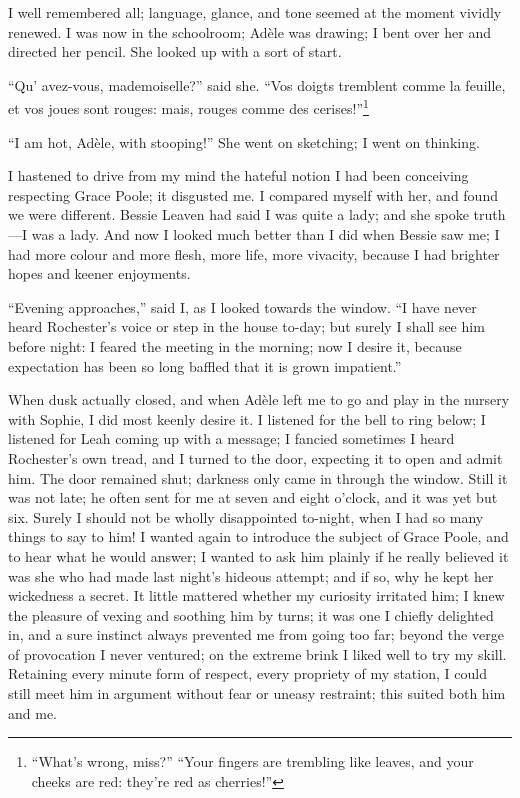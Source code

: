 I well remembered all; language, glance, and tone seemed at the moment
vividly renewed.  I was now in the schoolroom; Adèle was drawing; I bent
over her and directed her pencil.  She looked up with a sort of start.

\foreignquote{french}{Qu' avez-vous, mademoiselle?} said she.  \foreignquote{french}{Vos doigts
tremblent comme la feuille, et vos joues sont rouges: mais, rouges comme
des cerises!}\footnote{\enquote{What's wrong, miss?} \textelp{} \enquote{Your
fingers are trembling like leaves, and your cheeks are red: they're red as cherries!}}

\enquote{I am hot, Adèle, with stooping!}  She went on sketching; I went
on thinking.

I hastened to drive from my mind the hateful notion I had been
conceiving respecting Grace Poole; it disgusted me.  I compared myself
with her, and found we were different.  Bessie Leaven had said I was
quite a lady; and she spoke truth---I was a lady.  And now I looked much
better than I did when Bessie saw me; I had more colour and more flesh,
more life, more vivacity, because I had brighter hopes and keener
enjoyments.

\enquote{Evening approaches,} said I, as I looked towards the window. 
\enquote{I have never heard \Mr{} Rochester's voice or step in the house
to-day; but surely I shall see him before night: I feared the meeting in
the morning; now I desire it, because expectation has been so long
baffled that it is grown impatient.}

When dusk actually closed, and when Adèle left me to go and play in the
nursery with Sophie, I did most keenly desire it.  I listened for the
bell to ring below; I listened for Leah coming up with a message; I
fancied sometimes I heard \Mr{} Rochester's own tread, and I turned to the
door, expecting it to open and admit him.  The door remained shut;
darkness only came in through the window.  Still it was not late; he
often sent for me at seven and eight o'clock, and it was yet but six. 
Surely I should not be wholly disappointed to-night, when I had so many
things to say to him!  I wanted again to introduce the subject of Grace
Poole, and to hear what he would answer; I wanted to ask him plainly if
he really believed it was she who had made last night's hideous attempt;
and if so, why he kept her wickedness a secret.  It little mattered
whether my curiosity irritated him; I knew the pleasure of vexing and
soothing him by turns; it was one I chiefly delighted in, and a sure
instinct always prevented me from going too far; beyond the verge of
provocation I never ventured; on the extreme brink I liked well to try
my skill.  Retaining every minute form of respect, every propriety of my
station, I could still meet him in argument without fear or uneasy
restraint; this suited both him and me.

